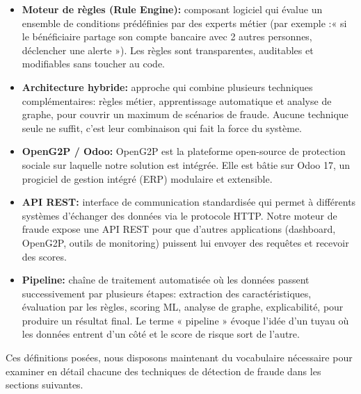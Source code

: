 \documentclass[a4paper, oneside, 12pt]{book}
\begin{document}
\begin{itemize}[label=\textbullet]

  \item \textbf{Moteur de règles (Rule Engine):} composant logiciel qui évalue un ensemble de conditions prédéfinies par des experts métier (par exemple :« si le bénéficiaire partage son compte bancaire avec 2 autres personnes, déclencher une alerte »). Les règles sont transparentes, auditables et modifiables sans toucher au code.

  \item \textbf{Architecture hybride:} approche qui combine plusieurs techniques complémentaires: règles métier, apprentissage automatique et analyse de graphe, pour couvrir un maximum de scénarios de fraude. Aucune technique seule ne suffit, c'est leur combinaison qui fait la force du système.

  \item \textbf{OpenG2P / Odoo:} OpenG2P est la plateforme open-source de protection sociale sur laquelle notre solution est intégrée. Elle est bâtie sur Odoo 17, un progiciel de gestion intégré (ERP) modulaire et extensible.

  \item \textbf{API REST:} interface de communication standardisée qui permet à différents systèmes d'échanger des données via le protocole HTTP. Notre moteur de fraude expose une API REST pour que d'autres applications (dashboard, OpenG2P, outils de monitoring) puissent lui envoyer des requêtes et recevoir des scores.

  \item \textbf{Pipeline:} chaîne de traitement automatisée où les données passent successivement par plusieurs étapes: extraction des caractéristiques, évaluation par les règles, scoring ML, analyse de graphe, explicabilité, pour produire un résultat final. Le terme « pipeline » évoque l'idée d'un tuyau où les données entrent d'un côté et le score de risque sort de l'autre.

\end{itemize}

\hspace{0.5cm}Ces définitions posées, nous disposons maintenant du vocabulaire nécessaire pour examiner en détail chacune des techniques de détection de fraude dans les sections suivantes.

\end{document}
